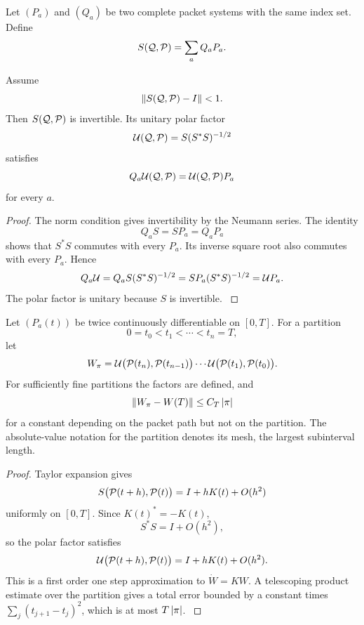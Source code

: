 Let \((P_a)\) and \((Q_a)\) be two complete packet systems with the same index set. Define
\[
S(\Qcal,\Pcal)=\sum_aQ_aP_a.
\]

\begin{theorem}\label{strong:theorem:016}\label{strong:thm:direct_rotation}
Assume
\[
\norm{S(\Qcal,\Pcal)-I}<1.
\]
Then \(S(\Qcal,\Pcal)\) is invertible. Its unitary polar factor
\[
\Ucal(\Qcal,\Pcal)
=
S(S^*S)^{-1/2}
\]
satisfies
\[
Q_a\Ucal(\Qcal,\Pcal)
=
\Ucal(\Qcal,\Pcal)P_a
\]
for every \(a\).
\end{theorem}

\begin{proof}\label{strong:proof:025}
The norm condition gives invertibility by the Neumann series. The identity
\[
Q_aS=SP_a=Q_aP_a
\]
shows that \(S^*S\) commutes with every \(P_a\). Its inverse square root also commutes with every \(P_a\). Hence
\[
Q_a\Ucal
=Q_aS(S^*S)^{-1/2}
=SP_a(S^*S)^{-1/2}
=\Ucal P_a.
\]
The polar factor is unitary because \(S\) is invertible.
\label{strong:proof:025:end}\end{proof}

\begin{theorem}\label{strong:theorem:017}\label{strong:thm:short_rotation_convergence}
Let \((P_a(t))\) be twice continuously differentiable on \([0,T]\). For a partition
\[
0=t_0<t_1<\cdots<t_n=T,
\]
let
\[
W_\pi
=
\Ucal\bigl(\Pcal(t_n),\Pcal(t_{n-1})\bigr)
\cdots
\Ucal\bigl(\Pcal(t_1),\Pcal(t_0)\bigr).
\]
For sufficiently fine partitions the factors are defined, and
\[
\left\lVert W_\pi-W(T)\right\rVert
\leq
C_T\left\lvert\pi\right\rvert
\]
for a constant depending on the packet path but not on the partition. The absolute-value notation for the partition denotes its mesh, the largest subinterval length.
\end{theorem}

\begin{proof}\label{strong:proof:026}
Taylor expansion gives
\[
S\bigl(\Pcal(t+h),\Pcal(t)\bigr)
=
I+hK(t)+O(h^2)
\]
uniformly on \([0,T]\). Since \(K(t)^*=-K(t)\),
\[
S^*S=I+O(h^2),
\]
so the polar factor satisfies
\[
\Ucal\bigl(\Pcal(t+h),\Pcal(t)\bigr)
=
I+hK(t)+O(h^2).
\]
This is a first order one step approximation to \(\dot W=KW\). A telescoping product estimate over the partition gives a total error bounded by a constant times \(\sum_j(t_{j+1}-t_j)^2\), which is at most \(T\left\lvert\pi\right\rvert\).
\label{strong:proof:026:end}\end{proof}

